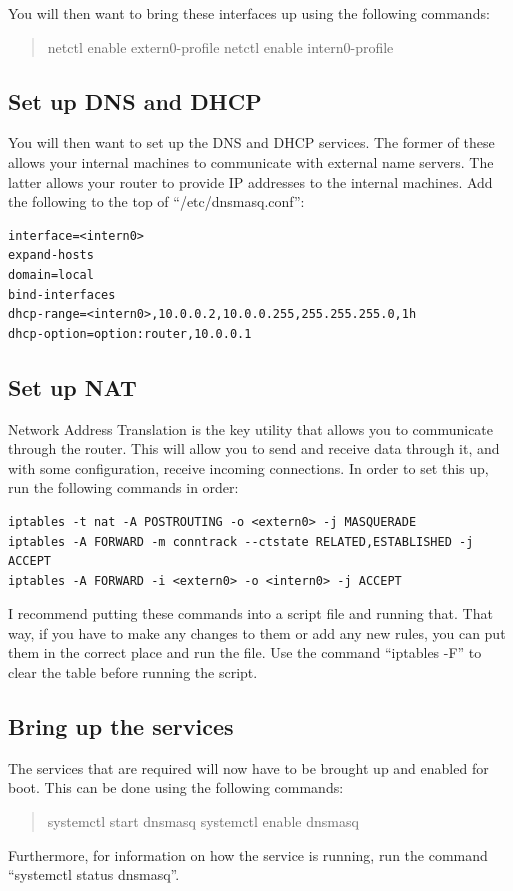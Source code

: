 \documentclass[a4paper,11pt]{report}
\begin{document}
				You will then want to bring these interfaces up using the following commands:
				\begin{quote}
					netctl enable extern0-profile
					netctl enable intern0-profile
				\end{quote}

			\subsection{Set up DNS and DHCP}
				You will then want to set up the DNS and DHCP services. 
				The former of these allows your internal machines to communicate with external name servers. 
				The latter allows your router to provide IP addresses to the internal machines. 
				Add the following to the top of ``/etc/dnsmasq.conf'':
				\begin{verbatim}
interface=<intern0>
expand-hosts    
domain=local    
bind-interfaces
dhcp-range=<intern0>,10.0.0.2,10.0.0.255,255.255.255.0,1h
dhcp-option=option:router,10.0.0.1
				\end{verbatim}

			\subsection{Set up NAT}
				Network Address Translation is the key utility that allows you to communicate through the router. 
				This will allow you to send and receive data through it, and with some configuration, receive incoming connections. 
				In order to set this up, run the following commands in order: 
				\begin{verbatim}
iptables -t nat -A POSTROUTING -o <extern0> -j MASQUERADE
iptables -A FORWARD -m conntrack --ctstate RELATED,ESTABLISHED -j ACCEPT
iptables -A FORWARD -i <extern0> -o <intern0> -j ACCEPT
				\end{verbatim}
				I recommend putting these commands into a script file and running that. 
				That way, if you have to make any changes to them or add any new rules, you can put them in the correct place and run the file. 
				Use the command ``iptables -F'' to clear the table before running the script. 

			\subsection{Bring up the services}
				The services that are required will now have to be brought up and enabled for boot. 
				This can be done using the following commands:
				\begin{quote}
					systemctl start dnsmasq
					systemctl enable dnsmasq
				\end{quote}
				Furthermore, for information on how the service is running, run the command ``systemctl status dnsmasq''. 
\end{document}
